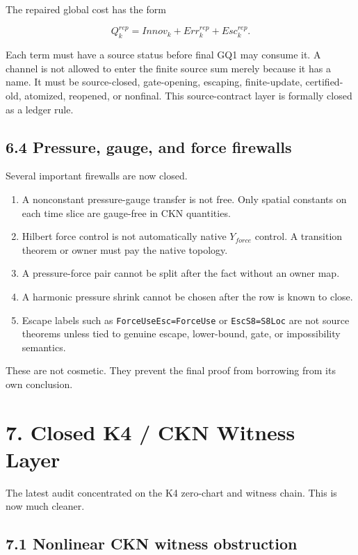 \documentclass[11pt]{article}
\begin{document}
The repaired global cost has the form

\[Q_k^{rep}=Innov_k+Err_k^{rep}+Esc_k^{rep}.\]

Each term must have a source status before final GQ1 may consume it. A channel is not allowed to enter the finite source sum merely because it has a name. It must be source-closed, gate-opening, escaping, finite-update, certified-old, atomized, reopened, or nonfinal. This source-contract layer is formally closed as a ledger rule.

\subsection*{6.4 Pressure, gauge, and force firewalls}

Several important firewalls are now closed.

\begin{enumerate}
\item
  A nonconstant pressure-gauge transfer is not free. Only spatial constants on each time slice are gauge-free in CKN quantities.
\item
  Hilbert force control is not automatically native \(Y_{force}\) control. A transition theorem or owner must pay the native topology.
\item
  A pressure-force pair cannot be split after the fact without an owner map.
\item
  A harmonic pressure shrink cannot be chosen after the row is known to close.
\item
  Escape labels such as \texttt{ForceUseEsc=ForceUse} or \texttt{EscS8=S8Loc} are not source theorems unless tied to genuine escape, lower-bound, gate, or impossibility semantics.
\end{enumerate}

These are not cosmetic. They prevent the final proof from borrowing from its own conclusion.

\section*{7. Closed K4 / CKN Witness Layer}

The latest audit concentrated on the K4 zero-chart and witness chain. This is now much cleaner.

\subsection*{7.1 Nonlinear CKN witness obstruction}
\end{document}
